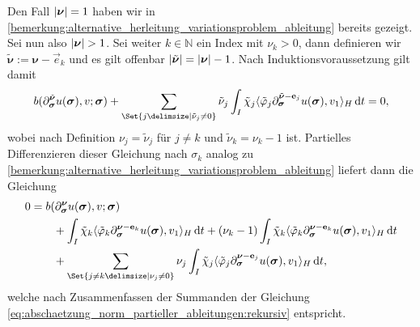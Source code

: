 \begin{Satz}
\begin{Beweis}
        Den Fall $\lvert\bm\nu\rvert = 1$ haben wir in \cref{bemerkung:alternative_herleitung_variationsproblem_ableitung} bereits gezeigt.
        Sei nun also $\lvert\bm\nu\rvert > 1$.
        Sei weiter $k \in \mathbb{N}$ ein Index mit $\nu_{k} > 0$, dann definieren wir $\tilde{\bm\nu} := \bm\nu - \vec e_{k}$ und es gilt offenbar $\lvert\tilde{\bm\nu}\rvert = \lvert\bm\nu\rvert - 1$.
        Nach Induktionsvoraussetzung gilt damit
        \begin{equation}
            b(\partial^{\tilde{\bm\nu}}_{\bm\sigma} u(\bm\sigma), v; \bm\sigma) + \sum_{\Set{j \given \tilde{\nu}_{j} \neq 0}} \tilde{\nu}_{j} \int_{I} \tilde{\chi}_{j} \skp{\tilde{\varphi}_{j} \partial^{\tilde{\bm\nu} - \vec e_{j}}_{\bm\sigma} u(\bm\sigma)}{v_{1}}{H} \diff t = 0,
        \end{equation}
        wobei nach Definition $\nu_{j} = \tilde{\nu}_{j}$ für $j \neq k$ und $\tilde{\nu}_{k} = \nu_{k} - 1$ ist.
        Partielles Differenzieren dieser Gleichung nach $\sigma_{k}$ analog zu \cref{bemerkung:alternative_herleitung_variationsproblem_ableitung} liefert dann die Gleichung
        \begin{align}
            0 &=
                b(\partial^{\bm\nu}_{\bm\sigma} u(\bm\sigma), v; \bm\sigma)
           \\&\qquad          + \int_{I} \tilde{\chi}_{k} \skp{\tilde{\varphi}_{k} \partial^{\bm\nu - \vec e_{k}}_{\bm\sigma} u(\bm\sigma)}{v_{1}}{H} \diff t
                + (\nu_{k} - 1) \int_{I} \tilde{\chi}_{k} \skp{\tilde{\varphi}_{k} \partial^{\bm\nu - \vec e_{k}}_{\bm\sigma} u(\bm\sigma) }{v_{1}}{H} \diff t
           \\&\qquad     + \sum_{\Set{j \neq k \given \nu_{j} \neq 0}} \nu_{j} \int_{I} \tilde{\chi}_{j} \skp{\tilde{\varphi}_{j} \partial^{\bm\nu - \vec e_{j}}_{\bm\sigma} u(\bm\sigma)}{v_{1}}{H} \diff t,
        \end{align}
        welche nach Zusammenfassen der Summanden der Gleichung \cref{eq:abschaetzung_norm_partieller_ableitungen:rekursiv} entspricht.


\end{Beweis}
\end{Satz}
